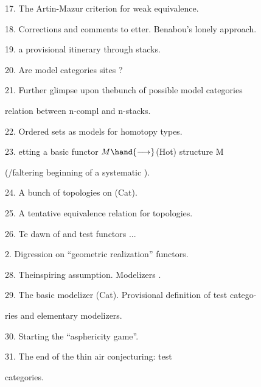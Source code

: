 17.  The Artin-Mazur  criterion for weak equivalence.\par
18.  Corrections and comments to etter.  Benabou's lonely approach.\par
19.   a provisional itinerary \hand{(}through stacks\hand{)}. \margin{\rule{2cm}{0.4pt}}\par
20.  Are model categories sites ?\par
21.  Further glimpse upon thebunch of possible model categories\hand{;} \par
relation between n-compl and n-stacks.\par
22.  Ordered sets as models for homotopy types.\par
\margin{$\bigcirc$}23.  etting a basic functor  $M \hand{\longrightarrow}$(Hot)    structure M\par
(/faltering beginning of a systematic ). \margin{\rule{2cm}{0.4pt}}\par

24.  A bunch of topologies on (Cat).\par
25.  A tentative equivalence relation for topologies.\par
26.  Te dawn of   and test functors ...\par
2.  Digression on ``geometric realization'' functors. \margin{\rule{2cm}{0.4pt}}\par
\margin{$\bigcirc$}28.  Theinspiring assumption.  Modelizers .\par
29.  The basic modelizer (Cat).  Provisional definition of test catego-\par%
ries and elementary modelizers. \margin{\rule{2cm}{0.4pt}}\par

30.  Starting  the ``asphericity game''.\par
\margin{$\bigcirc$}31.  The end of the thin air conjecturing:   test\par
categories. \margin{\rule{2cm}{0.4pt}}\par

